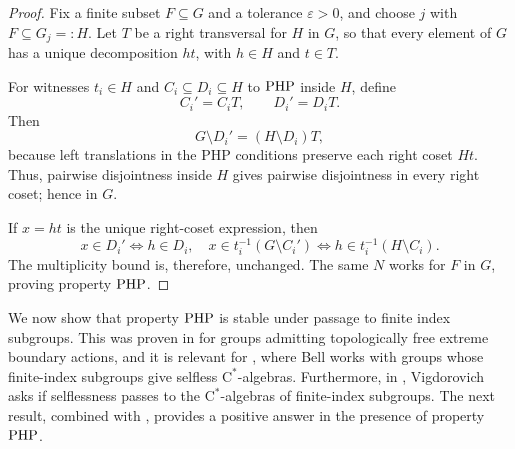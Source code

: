 \documentclass[11pt]{article}
\theoremstyle{definition}
\theoremstyle{remark}
\numberwithin{equation}{section}
\numberwithin{equation}{section}
\newcommand{\Cs}{\ensuremath{\mathrm{C}^\ast}}
\numberwithin{equation}{section}
\begin{document}
\begin{proof}
Fix a finite subset $F\subseteq G$ and a tolerance $\varepsilon>0$, and choose $j$ with $F\subseteq G_j=:H$. Let $T$ be a right transversal for $H$ in $ G$, so that every element of $ G$ has a unique decomposition $ht$, with $h\in H$ and $t\in T$.

For witnesses $t_i\in H$ and $C_i\subseteq D_i\subseteq H$ to ${\rm {PHP}}$ inside $H$, define
$$
 C_i'=C_iT,\qquad D_i'=D_iT.
$$
Then
$$
  G\setminus D_i'=(H\setminus D_i)T,
$$
because left translations in the PHP conditions preserve each right coset $Ht$. Thus, pairwise disjointness inside $H$ gives pairwise disjointness in every right coset; hence in $ G$.

If $x=ht$ is the unique right-coset expression, then
$$
 x\in D_i'\Longleftrightarrow h\in D_i, \quad x\in t_i^{-1}( G\setminus C_i')\Longleftrightarrow h\in t_i^{-1}(H\setminus C_i).
$$
The multiplicity bound is, therefore, unchanged. The same $N$ works for $F$ in $ G$, proving property ${\rm {PHP}}$.
\end{proof}

We now show that property ${\rm {PHP}}$ is stable under passage to finite index subgroups. This was proven in \cite{FKOCP26} for groups admitting topologically free extreme boundary actions, and it is relevant for \cite{Be26}, where Bell works with groups whose finite-index subgroups give selfless \Cs-algebras. Furthermore, in \cite[p. 18]{Vi26}, Vigdorovich asks if selflessness passes to the \Cs-algebras of finite-index subgroups. The next result, combined with \cite{Oz25}, provides a positive answer in the presence of property ${\rm {PHP}}$.
\end{document}
